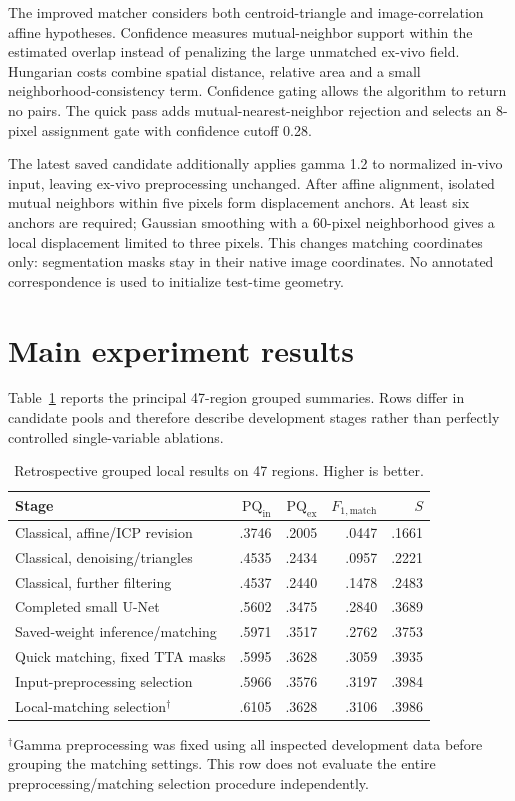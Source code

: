 \documentclass[11pt]{article}
\newcommand{\PQ}{\mathrm{PQ}}
\newcommand{\Fone}{F_{1,\mathrm{match}}}
\begin{document}
The improved matcher considers both centroid-triangle and image-correlation affine hypotheses. Confidence measures mutual-neighbor support within the estimated overlap instead of penalizing the large unmatched ex-vivo field. Hungarian costs combine spatial distance, relative area and a small neighborhood-consistency term. Confidence gating allows the algorithm to return no pairs. The quick pass adds mutual-nearest-neighbor rejection and selects an 8-pixel assignment gate with confidence cutoff 0.28.

The latest saved candidate additionally applies gamma 1.2 to normalized in-vivo input, leaving ex-vivo preprocessing unchanged. After affine alignment, isolated mutual neighbors within five pixels form displacement anchors. At least six anchors are required; Gaussian smoothing with a 60-pixel neighborhood gives a local displacement limited to three pixels. This changes matching coordinates only: segmentation masks stay in their native image coordinates. No annotated correspondence is used to initialize test-time geometry.

\section{Main experiment results}
Table~\ref{tab:grouped} reports the principal 47-region grouped summaries. Rows differ in candidate pools and therefore describe development stages rather than perfectly controlled single-variable ablations.

\begin{table}[htbp]
\centering\small
\caption{Retrospective grouped local results on 47 regions. Higher is better.}
\label{tab:grouped}
\begin{tabularx}{\linewidth}{@{}Xrrrr@{}}
\toprule
Stage & $\PQ_{\mathrm{in}}$ & $\PQ_{\mathrm{ex}}$ & $\Fone$ & $S$\\
\midrule
Classical, affine/ICP revision & .3746 & .2005 & .0447 & .1661\\
Classical, denoising/triangles & .4535 & .2434 & .0957 & .2221\\
Classical, further filtering & .4537 & .2440 & .1478 & .2483\\
Completed small U-Net & .5602 & .3475 & .2840 & .3689\\
Saved-weight inference/matching & .5971 & .3517 & .2762 & .3753\\
Quick matching, fixed TTA masks & .5995 & .3628 & .3059 & .3935\\
Input-preprocessing selection & .5966 & .3576 & .3197 & .3984\\
Local-matching selection$^\dagger$ & .6105 & .3628 & .3106 & .3986\\
\bottomrule
\end{tabularx}
\vspace{3pt}
\parbox{\linewidth}{\footnotesize $^\dagger$Gamma preprocessing was fixed using all inspected development data before grouping the matching settings. This row does not evaluate the entire preprocessing/matching selection procedure independently.}
\end{table}
\end{document}
